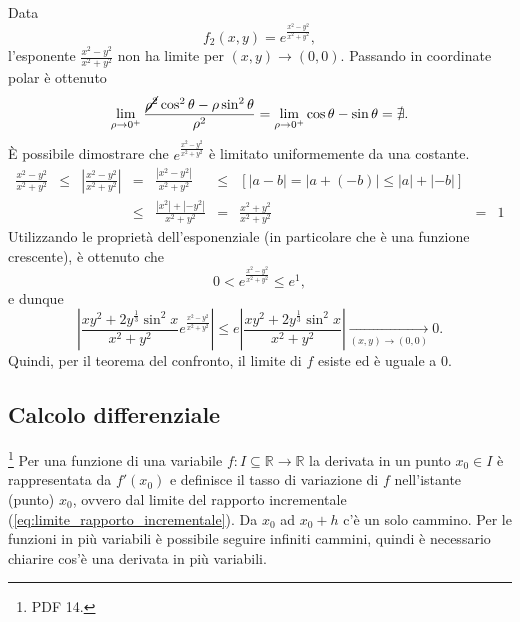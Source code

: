 \begin{example}
	\noindent Data
	\begin{equation*}
		f_2(x,y) = e^{\frac{x^2-y^2}{x^2+y^2}},
	\end{equation*}
	l'esponente $\frac{x^2-y^2}{x^2+y^2}$ non ha limite per $(x,y)\rightarrow(0,0)$. Passando in coordinate polar è ottenuto
	\begin{equation*}
		\lim_{\rho\rightarrow 0^+} \frac{\cancel{\rho^2} \cos^2\theta - \rho\sin^2\theta}{\rho^2} = \lim_{\rho \rightarrow 0^+}\cos\theta-\sin\theta =\nexists.
	\end{equation*}
	È possibile dimostrare che $e^{\frac{x^2-y^2}{x^2+y^2}}$ è limitato uniformemente da una costante.
	\begin{equation*}
		\begin{matrix}
			\frac{x^2-y^2}{x^2+y^2} &\leq& \left|\frac{x^2-y^2}{x^2+y^2}\right| &=&  \frac{|x^2-y^2|}{x^2+y^2} &\leq& [|a-b| = |a+(-b)| \leq |a| + |-b|]\\
			&&&\leq& \frac{|x^2|+|-y^2|}{x^2+y^2} &=& \frac{x^2+y^2}{x^2+y^2} &=& 1
		\end{matrix}
	\end{equation*}
	Utilizzando le proprietà dell'esponenziale (in particolare che è una funzione crescente), è ottenuto che
	\begin{equation*}
		0 < e^{\frac{x^2-y^2}{x^2+y^2}} \leq e^1,
	\end{equation*}
	e dunque
	\begin{equation*}
		\left|\frac{xy^2+2y^{\frac{1}{3}}\sin^2x}{x^2+y^2}e^{\frac{x^2-y^2}{x^2+y^2}}\right| \leq e \left|\frac{xy^2+2y^{\frac{1}{3}}\sin^2x}{x^2+y^2}\right|\underset{(x,y)\rightarrow (0,0)}{\longrightarrow} 0.
	\end{equation*}
	Quindi, per il teorema del confronto, il limite di $f$ esiste ed è uguale a 0.
\end{example}

\subsection{Calcolo differenziale}\footnote{PDF 14.}
Per una funzione di una variabile $f:I\subseteq\mathbb R\rightarrow\mathbb R$ la derivata in un punto $x_0\in I$ è rappresentata da $f'(x_0)$ e definisce il tasso di variazione di $f$ nell'istante (punto) $x_0$, ovvero dal limite del rapporto incrementale (\ref{eq:limite_rapporto_incrementale}). Da $x_0$ ad $x_0+h$ c'è un solo cammino. Per le funzioni in più variabili è possibile seguire infiniti cammini, quindi è necessario chiarire cos'è una derivata in più variabili.
